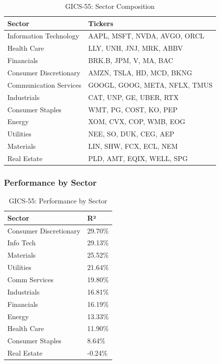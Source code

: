 \documentclass[12pt,a4paper]{article}
\begin{document}
\begin{table}[H]
\centering
\begin{tabular}{ll}
\toprule
\textbf{Sector} & \textbf{Tickers} \\
\midrule
Information Technology & AAPL, MSFT, NVDA, AVGO, ORCL \\
Health Care & LLY, UNH, JNJ, MRK, ABBV \\
Financials & BRK.B, JPM, V, MA, BAC \\
Consumer Discretionary & AMZN, TSLA, HD, MCD, BKNG \\
Communication Services & GOOGL, GOOG, META, NFLX, TMUS \\
Industrials & CAT, UNP, GE, UBER, RTX \\
Consumer Staples & WMT, PG, COST, KO, PEP \\
Energy & XOM, CVX, COP, WMB, EOG \\
Utilities & NEE, SO, DUK, CEG, AEP \\
Materials & LIN, SHW, FCX, ECL, NEM \\
Real Estate & PLD, AMT, EQIX, WELL, SPG \\
\bottomrule
\end{tabular}
\caption{GICS-55: Sector Composition}
\label{tab:gics55_composition}
\end{table}

\subsubsection{Performance by Sector}

\begin{table}[H]
\centering
\begin{tabular}{ll}
\toprule
\textbf{Sector} & \textbf{R²} \\
\midrule
Consumer Discretionary & 29.70\% \\
Info Tech & 29.13\% \\
Materials & 25.52\% \\
Utilities & 21.64\% \\
Comm Services & 19.80\% \\
Industrials & 16.81\% \\
Financials & 16.19\% \\
Energy & 13.33\% \\
Health Care & 11.90\% \\
Consumer Staples & 8.64\% \\
Real Estate & -0.24\% \\
\bottomrule
\end{tabular}
\caption{GICS-55: Performance by Sector}
\label{tab:gics55_sectors}
\end{table}
\end{document}
